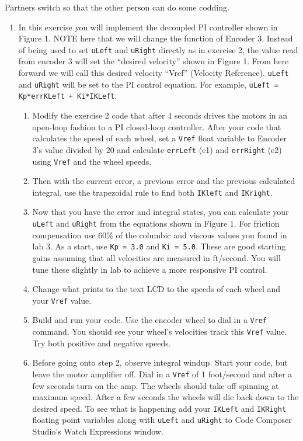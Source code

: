 \documentclass[11pt]{article}
\begin{document}
Partners switch so that the other person can do some codding.
%
\begin{enumerate}
        \item In this exercise you will implement the decoupled PI controller shown in Figure 1. NOTE here that we will change the function of Encoder 3. Instead of being used to set \texttt{uLeft} and \texttt{uRight} directly as in exercise 2, the value read from encoder 3 will set the “desired velocity” shown in Figure 1. From here forward we will call this desired velocity “Vref” (Velocity Reference). \texttt{uLeft} and \texttt{uRight} will be set to the PI control equation. For example, \texttt{uLeft = Kp*errKLeft + Ki*IKLeft}.
        \begin{enumerate}
                \item Modify the exercise 2 code that after 4 seconds drives the motors in an open-loop fashion to a PI closed-loop controller. After your code that calculates the speed of each wheel, set a \texttt{Vref} float variable to Encoder 3’s value divided by 20 and calculate \texttt{errLeft} (e1) and \texttt{errRight} (e2) using \texttt{Vref} and the wheel speeds.
                \item Then with the current error, a previous error and the previous calculated integral, use the trapezoidal rule to find both \texttt{IKleft} and \texttt{IKright}.
                \item Now that you have the error and integral states, you can calculate your \texttt{uLeft} and \texttt{uRight} from the equations shown in Figure 1. For friction compensation use 60\% of the columbic and viscous values you found in lab 3. As a start, use \texttt{Kp = 3.0} and \texttt{Ki = 5.0}. These are good starting gains assuming that all velocities are measured in ft/second. You will tune these slightly in lab to achieve a more responsive PI control.
                \item Change what prints to the text LCD to the speeds of each wheel and your \texttt{Vref} value.
                \item Build and run your code. Use the encoder wheel to dial in a \texttt{Vref} command. You should see your wheel’s velocities track this \texttt{Vref} value. Try both positive and negative speeds.
                \item Before going onto step 2, observe integral windup. Start your code, but leave the motor amplifier off. Dial in a \texttt{Vref} of 1 foot/second and after a few seconds turn on the amp. The wheels should take off spinning at maximum speed. After a few seconds the wheels will die back down to the desired speed. To see what is happening add your \texttt{IKLeft} and \texttt{IKRight} floating point variables along with \texttt{uLeft} and \texttt{uRight} to Code Composer Studio’s Watch Expressions window.

\end{enumerate}
\end{enumerate}
\end{document}
